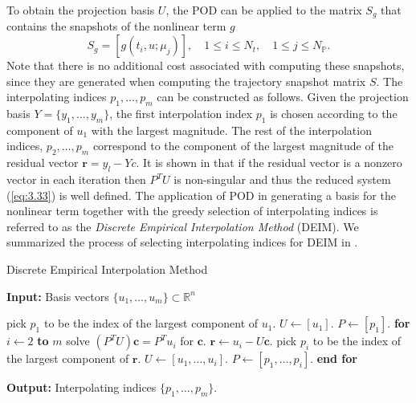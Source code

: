 To obtain the projection basis $U$, the POD can be applied to the matrix $S_g$ that contains the snapshots of the nonlinear term $g$
\begin{equation} \label{eq:3.34}
	S_g = [g(t_i,u;\mu_j)],\quad 1\leq i \leq N_t,\quad 1 \leq j \leq N_{\mathbb P}.
\end{equation}
Note that there is no additional cost associated with computing these snapshots, since they are generated when computing the trajectory snapshot matrix $S$. The interpolating indices $p_1,\dots,p_m$ can be constructed as follows. Given the projection basis $Y = \{y_1,\dots,y_m\}$, the first interpolation index $p_1$ is chosen according to the component of $u_1$ with the largest magnitude. The rest of the interpolation indices, $p_2,\dots,p_m$ correspond to the component of the largest magnitude of the residual vector $\mathbf r = y_l - Y c$. It is shown in \cite{doi:10.1137/090766498} that if the residual vector is a nonzero vector in each iteration then $P^TU$ is non-singular and thus the reduced system (\ref{eq:3.33}) is well defined. The application of POD in generating a basis for the nonlinear term together with the greedy selection of interpolating indices is referred to as the \emph{Discrete Empirical Interpolation Method} (DEIM). We summarized the process of selecting interpolating indices for DEIM in .

\begin{algorithm} 
\caption{Discrete Empirical Interpolation Method} \label{alg:3.4}
{\bf Input:}  Basis vectors $\{u_1,\dots , u_m\}\subset \mathbb R^n$
\begin{algorithmic} [1]
	\State pick $p_1$ to be the index of the largest component of $u_1$.
	\State $U \leftarrow [u_1]$.
	\State $P \leftarrow [p_1]$.
	\State \textbf{for} $i\leftarrow 2$ \textbf{to} $m$
		\State \hspace{0.5cm} solve $(P^TU)\mathbf c = P^T u_i$ for $\mathbf c$.
		\State \hspace{0.5cm} $\mathbf r \leftarrow u_i - U\mathbf c$.
		\State \hspace{0.5cm} pick $p_i$ to be the index of the largest component of $\mathbf r$.
		\State \hspace{0.5cm} $U \leftarrow [u_1,\dots,u_i]$.
		\State \hspace{0.5cm} $P \leftarrow [p_1,\dots,p_i]$.
	\State \textbf{end for}
\end{algorithmic}
\vspace{0.5cm}
{\bf Output:} Interpolating indices $\{p_1,\dots,p_m\}$.
\end{algorithm}


